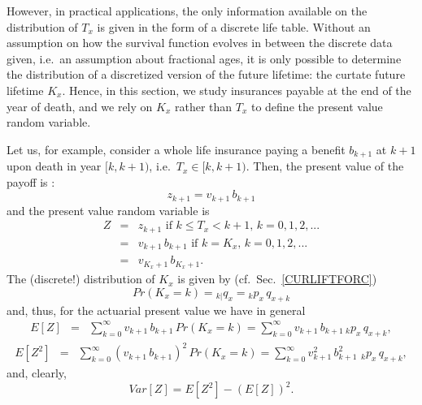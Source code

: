 \documentclass[11pt,fleqn,oneside]{book}
\begin{document}
However, in practical applications, the only information available on the distribution of $T_x$ is given in the form of a discrete life table. Without an assumption on how the survival function evolves in between the discrete data given, i.e.\ an assumption about fractional ages, it is only possible to determine the distribution of a discretized version of the future lifetime: the curtate future lifetime $K_x$. Hence, in this section, we study insurances payable at the end of the year of death, and we rely on $K_x$ rather than $T_x$ to define the present value random variable. 

Let us, for example, consider a whole life insurance paying a benefit $b_{k+1}$ at $k+1$ upon death in year $[k,k+1)$, i.e.\ $T_x \in [k,k+1)$. Then, the present value of the payoff is :
$$
z_{k+1} = v_{k+1}\,b_{k+1}
$$
and the present value random variable is
\begin{eqnarray*}
Z &=& z_{k+1} \text{ if }k\leq T_x < k+1,\,k=0,1,2,...\\
&=& v_{k+1}\,b_{k+1} \text{ if }k = K_x,\,k=0,1,2,...\\
&=& v_{K_x+1}\,b_{K_x+1}.
\end{eqnarray*}
The (discrete!) distribution of $K_x$ is given by (cf.\ Sec.\ \ref{CURLIFTFORC})
$$
Pr\left(K_x=k\right) = {_{k|}q_x} = {_kp_x}\,{q_{x+k}}
$$
and, thus, for the actuarial present value we have in general
\begin{eqnarray*}
E[Z] &=& \sum_{k=0}^{\infty} v_{k+1}\,b_{k+1}\,Pr(K_x=k)
= \sum_{k=0}^{\infty} v_{k+1}\,b_{k+1}\,{_kp_x}\,{q_{x+k}},
\end{eqnarray*}
\begin{eqnarray*}
 E[Z^2] &=&  \sum_{k=0}^{\infty} \left(v_{k+1}\,b_{k+1}\right)^2\,Pr(K_x=k)
=  \sum_{k=0}^{\infty} v_{k+1}^2\,b_{k+1}^2\,\,{_kp_x}\,{q_{x+k}},
\end{eqnarray*}
and, clearly,
$$
Var[Z] = E[Z^2] - \left(E[Z]\right)^2.
$$
\end{document}
